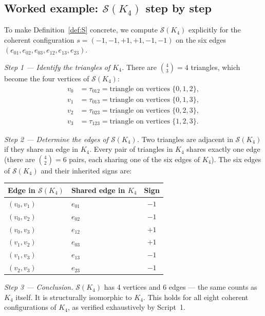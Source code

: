 \documentclass[12pt,a4paper]{article}
\theoremstyle{plain}
\theoremstyle{definition}
\theoremstyle{remark}
\newcommand{\Kfour}{K_4}
\newcommand{\Sop}{\mathcal{S}}
\begin{document}
\subsection{Worked example: \texorpdfstring{$\Sop(\Kfour)$}{S(K4)} step by step}

To make Definition~\ref{def:S} concrete, we compute $\Sop(\Kfour)$ explicitly for
the coherent configuration $s = (-1,-1,+1,+1,-1,-1)$ on the six edges
$(e_{01}, e_{02}, e_{03}, e_{12}, e_{13}, e_{23})$.

\emph{Step 1 --- Identify the triangles of $\Kfour$.} There are $\binom{4}{3} = 4$
triangles, which become the four vertices of $\Sop(\Kfour)$:
\begin{align*}
v_0 &= \tau_{012} = \text{triangle on vertices } \{0,1,2\}, \\
v_1 &= \tau_{013} = \text{triangle on vertices } \{0,1,3\}, \\
v_2 &= \tau_{023} = \text{triangle on vertices } \{0,2,3\}, \\
v_3 &= \tau_{123} = \text{triangle on vertices } \{1,2,3\}.
\end{align*}

\emph{Step 2 --- Determine the edges of $\Sop(\Kfour)$.} Two triangles are adjacent
in $\Sop(\Kfour)$ if they share an edge in $\Kfour$. Every pair of triangles in
$\Kfour$ shares exactly one edge (there are $\binom{4}{2} = 6$ pairs, each sharing
one of the six edges of $\Kfour$). The six edges of $\Sop(\Kfour)$ and their
inherited signs are:
\begin{center}
\begin{tabular}{llc}
\toprule
Edge in $\Sop(\Kfour)$ & Shared edge in $\Kfour$ & Sign \\
\midrule
$(v_0, v_1)$ & $e_{01}$ & $-1$ \\
$(v_0, v_2)$ & $e_{02}$ & $-1$ \\
$(v_0, v_3)$ & $e_{12}$ & $+1$ \\
$(v_1, v_2)$ & $e_{03}$ & $+1$ \\
$(v_1, v_3)$ & $e_{13}$ & $-1$ \\
$(v_2, v_3)$ & $e_{23}$ & $-1$ \\
\bottomrule
\end{tabular}
\end{center}

\emph{Step 3 --- Conclusion.} $\Sop(\Kfour)$ has 4 vertices and 6 edges --- the same
counts as $\Kfour$ itself. It is structurally isomorphic to $\Kfour$. This holds for
all eight coherent configurations of $\Kfour$, as verified exhaustively by Script~1.
\end{document}
